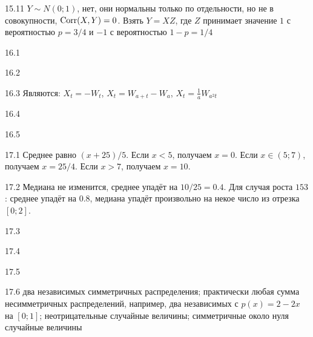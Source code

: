 \protect \hypertarget {soln:15.11}{}
\begin{solution}{{15.11}}
  $Y \sim N(0;1)$, нет, они нормальны только по отдельности, но не в совокупности, $\operatorname{Corr}(X,Y)=0$. Взять $Y=XZ$, где $Z$ принимает значение $1$ с вероятностью $p=3/4$ и $-1$ с вероятностью $1-p=1/4$
\end{solution}
\protect \hypertarget {soln:16.1}{}
\begin{solution}{{16.1}}
\end{solution}
\protect \hypertarget {soln:16.2}{}
\begin{solution}{{16.2}}
\end{solution}
\protect \hypertarget {soln:16.3}{}
\begin{solution}{{16.3}}
Являются: $X_{t}=-W_{t}$, $X_{t}=W_{a+t}-W_{a}$, $X_{t}=\frac{1}{a}W_{a^{2}t}$
\end{solution}
\protect \hypertarget {soln:16.4}{}
\begin{solution}{{16.4}}
\end{solution}
\protect \hypertarget {soln:16.5}{}
\begin{solution}{{16.5}}
\end{solution}
\protect \hypertarget {soln:17.1}{}
\begin{solution}{{17.1}}
Среднее равно $(x+25)/5$. Если $x<5$, получаем $x=0$. Если $x \in (5; 7)$, получаем $x=25/4$. Если $x>7$, получаем $x=10$.
\end{solution}
\protect \hypertarget {soln:17.2}{}
\begin{solution}{{17.2}}
Медиана не изменится, среднее упадёт на $10/25=0.4$. Для случая роста $153$: среднее упадёт на $0.8$, медиана упадёт произвольно на некое число из отрезка $[0;2]$.
\end{solution}
\protect \hypertarget {soln:17.3}{}
\begin{solution}{{17.3}}
\end{solution}
\protect \hypertarget {soln:17.4}{}
\begin{solution}{{17.4}}
\end{solution}
\protect \hypertarget {soln:17.5}{}
\begin{solution}{{17.5}}
\end{solution}
\protect \hypertarget {soln:17.6}{}
\begin{solution}{{17.6}}
  два независимых симметричных распределения; практически любая сумма несимметричных распределений, например, два независимых с $p(x)=2-2x$ на $[0;1]$; неотрицательные случайные величины; симметричные около нуля случайные величины
\end{solution}
